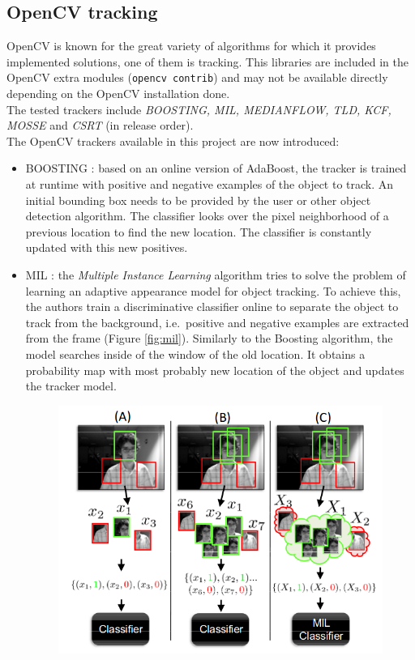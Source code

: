 \subsection{OpenCV tracking}
OpenCV is known for the great variety of algorithms for which it provides implemented solutions, one of them is tracking. This libraries are included in the OpenCV extra modules (\texttt{opencv contrib}) and may not be available directly depending on the OpenCV installation done.\\
The tested trackers include \textit{BOOSTING, MIL, MEDIANFLOW, TLD, KCF, MOSSE} and \textit{CSRT} (in release order).
\\
The OpenCV trackers available in this project are now introduced:
\begin{itemize}
\item BOOSTING \cite{grabner2006real}: based on an online version of AdaBoost, the tracker is trained at runtime with positive and negative examples of the object to track. An initial bounding box needs to be provided by the user or other object detection algorithm. The classifier looks over the pixel neighborhood of a previous location to find the new location. The classifier is constantly updated with this new positives.
\item MIL \cite{babenko2009visual}: the \textit{Multiple Instance Learning} algorithm tries to solve the problem of learning an adaptive appearance model for object tracking. To achieve this, the authors train a discriminative classifier online to separate the object to track from the background, i.e.\ positive and negative examples are extracted from the frame (Figure \ref{fig:mil}). Similarly to the Boosting algorithm, the model searches inside of the window of the old location. It obtains a probability map with most probably new location of the object and updates the tracker model.
\begin{figure}[H]
\begin{center}
\includegraphics[scale=0.4]{figures/mil.png}

\end{center}
\end{figure}
\end{itemize}
